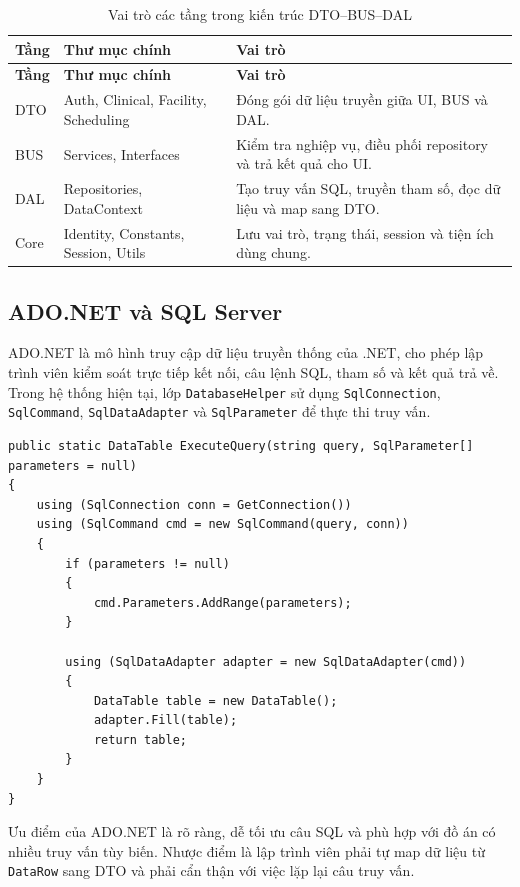 \documentclass[12pt,a4paper]{article}
\numberwithin{figure}{subsection}
\numberwithin{table}{subsection}
\newcounter{codecounter}
\newenvironment{codeblock}[2]{%
    \refstepcounter{codecounter}%
    \phantomsection%
    \label{#1}%
    \par\smallskip
}{%
    \par\smallskip
}
\begin{document}
\begin{longtable}{|p{3.3cm}|p{4.2cm}|p{6.2cm}|}
\caption{Vai trò các tầng trong kiến trúc DTO--BUS--DAL} \\
\hline
\textbf{Tầng} & \textbf{Thư mục chính} & \textbf{Vai trò} \\
\hline
\endfirsthead
\hline
\textbf{Tầng} & \textbf{Thư mục chính} & \textbf{Vai trò} \\
\hline
\endhead
DTO & Auth, Clinical, Facility, Scheduling & Đóng gói dữ liệu truyền giữa UI, BUS và DAL. \\
\hline
BUS & Services, Interfaces & Kiểm tra nghiệp vụ, điều phối repository và trả kết quả cho UI. \\
\hline
DAL & Repositories, DataContext & Tạo truy vấn SQL, truyền tham số, đọc dữ liệu và map sang DTO. \\
\hline
Core & Identity, Constants, Session, Utils & Lưu vai trò, trạng thái, session và tiện ích dùng chung. \\
\hline
\end{longtable}

\subsection{ADO.NET và SQL Server}

ADO.NET là mô hình truy cập dữ liệu truyền thống của .NET, cho phép lập trình viên kiểm soát trực tiếp kết nối, câu lệnh SQL, tham số và kết quả trả về. Trong hệ thống hiện tại, lớp \texttt{DatabaseHelper} sử dụng \texttt{SqlConnection}, \texttt{SqlCommand}, \texttt{SqlDataAdapter} và \texttt{SqlParameter} để thực thi truy vấn.

\begin{codeblock}{code:ado-model}{Mô hình truy vấn ADO.NET}
\begin{verbatim}
public static DataTable ExecuteQuery(string query, SqlParameter[] parameters = null)
{
    using (SqlConnection conn = GetConnection())
    using (SqlCommand cmd = new SqlCommand(query, conn))
    {
        if (parameters != null)
        {
            cmd.Parameters.AddRange(parameters);
        }

        using (SqlDataAdapter adapter = new SqlDataAdapter(cmd))
        {
            DataTable table = new DataTable();
            adapter.Fill(table);
            return table;
        }
    }
}
\end{verbatim}
\end{codeblock}

Ưu điểm của ADO.NET là rõ ràng, dễ tối ưu câu SQL và phù hợp với đồ án có nhiều truy vấn tùy biến. Nhược điểm là lập trình viên phải tự map dữ liệu từ \texttt{DataRow} sang DTO và phải cẩn thận với việc lặp lại câu truy vấn.
\end{document}
